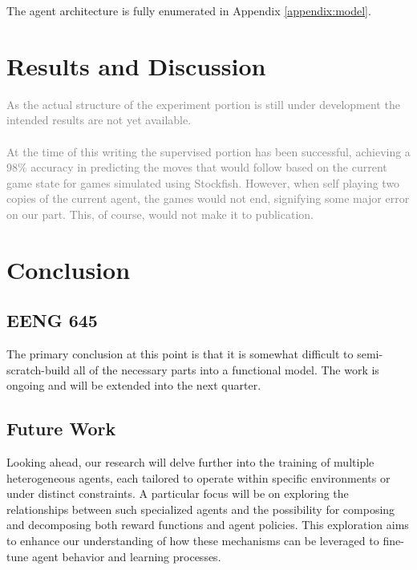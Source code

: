 \documentclass[journal]{IEEEtran}
\begin{document}
	The agent architecture is fully enumerated in Appendix \ref{appendix:model}.
	
	\begin{comment}		
		The board state is held between turns using the python-chess api.
		The state is passed to the agent as a pair of \(8\times8\times7\) tensors representing a copy of the board for each of the \(7\) types of pieces. 
		
	\end{comment}
	
	\section{Results and Discussion}
	\label{sec:results_discussion}
	
	\textcolor{gray}{
		As the actual structure of the experiment portion is still under development the intended results are not yet available.
		\\	\\
		At the time of this writing the supervised portion has been successful, achieving a 98\% accuracy in predicting the moves
		that would follow based on the current game state for games simulated using Stockfish. 
		However, when self playing two copies of the current agent, the games would not end, 
		signifying some major error on our part.
		This, of course, would not make it to publication.
		}
	
	\begin{comment}
		Significant performance in predicting the moves that the stockfish engine will make next.
	\end{comment}
	
	
	\section{Conclusion}
	\label{sec:conclusion}
	
	\subsection{EENG 645}
	The primary conclusion at this point is that it is somewhat difficult to semi-scratch-build all of the necessary parts
	into a functional model. The work is ongoing and will be extended into the next quarter.
	
	\subsection{Future Work}
		Looking ahead, our research will delve further into the training of multiple heterogeneous agents, 
		each tailored to operate within specific environments or under distinct constraints. 
		A particular focus will be on exploring the relationships between such specialized agents and the 
		possibility for composing and decomposing both reward functions and agent policies. 
		This exploration aims to enhance our understanding of how these mechanisms can be leveraged to 
		fine-tune agent behavior and learning processes.
	
\end{document}
